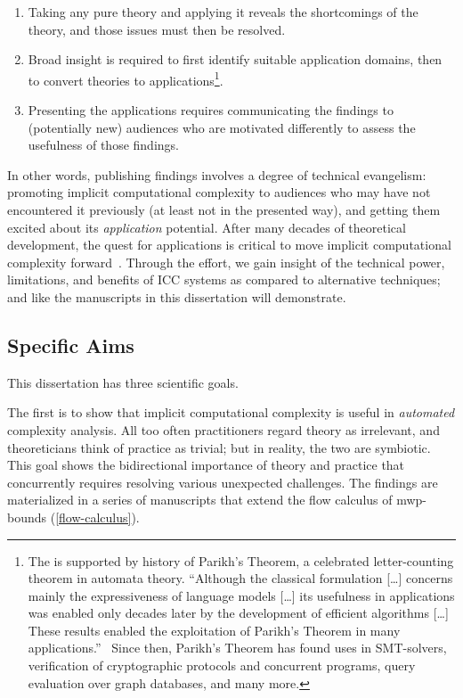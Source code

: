 \begin{enumerate}

\item Taking any pure theory and applying it reveals the shortcomings of the theory, and those issues must then be resolved.

\item Broad insight is required to first identify suitable application domains, then to convert theories to applications\footnote{
The is supported by history of Parikh's Theorem, a celebrated letter-counting theorem in automata theory.
\enquote{Although the classical formulation [\ldots] concerns mainly the expressiveness of language models [\ldots] its usefulness in applications was enabled {only decades later} by the development of efficient algorithms [\ldots] These results enabled the exploitation of Parikh’s Theorem in many applications.}~\cite[pg. 2]{hague2024}
Since then, Parikh's Theorem has found uses in SMT-solvers, verification of cryptographic protocols and concurrent programs, query evaluation over graph databases, and many more.}.

\item Presenting the applications requires communicating the findings to (potentially new) audiences who are motivated differently to assess the {usefulness} of those findings.
\end{enumerate}

In other words, publishing findings involves a degree of technical evangelism: promoting implicit computational complexity to audiences who may have not encountered it previously (at least not in the presented way), and getting them excited about its \emph{application} potential.
After many decades of theoretical development, the quest for applications is critical to move implicit computational complexity forward~\cite[p.~7]{moyen2017}.
Through the effort, we gain insight of the technical power, limitations, and benefits of ICC systems as compared to alternative techniques; and like the manuscripts in this dissertation will demonstrate.

\subsection{Specific Aims}\label{subsec:specific-aims}

This dissertation has three scientific goals.

The first is to show that implicit computational complexity is useful in \emph{automated} complexity analysis.
All too often practitioners regard theory as irrelevant, and theoreticians think of practice as trivial; but in reality, the two are symbiotic.
This goal shows the bidirectional importance of theory and practice that concurrently requires resolving various unexpected challenges. 
The findings are materialized in a series of manuscripts that extend the flow calculus of mwp-bounds (\autoref{flow-calculus}).

